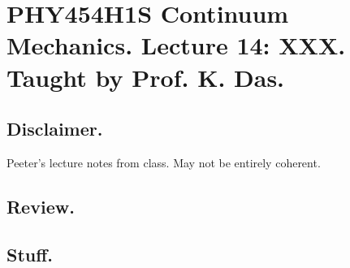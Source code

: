 
%

\chapter{PHY454H1S Continuum Mechanics.  Lecture 14: XXX.  Taught by Prof. K. Das.}
\label{chap:continuumL14}
{}
\date{Mar 7, 2012}

\beginArtWithToc

\section{Disclaimer.}

Peeter's lecture notes from class.  May not be entirely coherent.

\section{Review.}

\section{Stuff.}


\EndNoBibArticle
